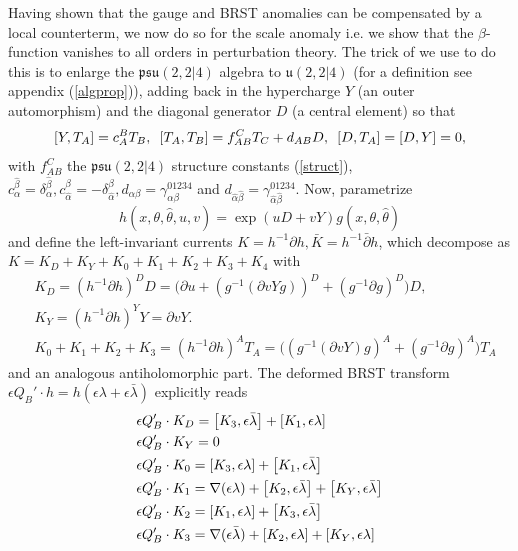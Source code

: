 \documentclass[12pt]{article}
\def\be{\begin{equation}}
\def\ee{\end{equation}}
\numberwithin{equation}{section}
\newcommand{\h}[1]{\hat{#1}}
\begin{document}
Having shown that the gauge and BRST anomalies can be compensated by a local counterterm, we now do so for the scale anomaly i.e. we show that the $\beta$-function vanishes to all orders in perturbation theory. The trick of \cite{Berkovits:1999im} we use to do this is to enlarge the $\mathfrak{psu}(2,2|4)$ algebra to $\mathfrak{u}(2,2|4)$ (for a definition see appendix (\ref{algprop})), adding back in the hypercharge $Y$ (an outer automorphism) and the diagonal generator $D$ (a central element) so that
\be
\comm{Y}{T_A} = c_A^B T_B, \,\,\, \comm{T_A}{T_B} = f_{AB}^C T_C + d_{AB} D, \,\,\, \comm{D}{T_A} = \comm{D}{Y} = 0,
\label{newStruct}
\ee
with $f_{AB}^C$ the $\mathfrak{psu}(2,2|4)$ structure constants (\ref{struct}), $c_\alpha^{\h{\beta}} = \delta_\alpha^{\h{\beta}}, c_{\h{\alpha}}^\beta = -\delta_{\h{\alpha}}^\beta, d_{\alpha \beta} = \gamma_{\alpha \beta}^{01234}$ and $d_{\h{\alpha}\h{\beta}} = \gamma_{\h{\alpha}\h{\beta}}^{01234}$. Now, parametrize
\be
h(x,\theta,\h{\theta},u,v) = \exp(u D + v Y) g(x,\theta, \h{\theta})
\ee
and define the left-invariant currents $K = h^{-1} \partial h, \bar{K} = h^{-1} \bar{\partial} h$, which decompose as $K = K_D + K_Y + K_0 + K_1 + K_2 + K_3 + K_4$ with
\be
\begin{aligned}
	&K_D = (h^{-1} \partial h)^D D = \big(\partial u + (g^{-1} (\partial v Y g))^D + (g^{-1} \partial g)^D\big)D, \\
	&K_Y = (h^{-1} \partial h)^Y Y = \partial v Y. \\
	&K_0 + K_1 + K_2 + K_3 = (h^{-1}\partial h)^A T_A = \big((g^{-1}(\partial v Y)g)^A + (g^{-1}\partial g)^A \big)T_A
	\label{Kdecomp}
\end{aligned}
\ee
and an analogous antiholomorphic part.
The deformed BRST transform $\epsilon Q_B' \cdot h = h(\epsilon \lambda + \epsilon \bar{\lambda})$ explicitly reads
\begin{align}
&\epsilon Q_B' \cdot K_D = \comm{K_3}{\epsilon \bar{\lambda}} + \comm{K_1}{\epsilon \lambda} \\
&\epsilon Q_B' \cdot K_Y = 0 \\
& \epsilon Q_B' \cdot K_0 = \comm{K_3}{\epsilon \lambda} + \comm{K_1}{\epsilon \bar{\lambda}} \\
& \epsilon Q_B' \cdot K_1 = \nabla (\epsilon \lambda) +\comm{K_2}{\epsilon \bar{\lambda}} +  \comm{K_Y}{\epsilon \bar{\lambda}} \\
& \epsilon Q_B' \cdot K_2 = \comm{K_1}{\epsilon \lambda} + \comm{K_3}{\epsilon \bar{\lambda}} \\
& \epsilon Q_B' \cdot K_3 = \nabla (\epsilon \bar{\lambda}) + \comm{K_2}{\epsilon \lambda} + \comm{K_Y}{\epsilon \lambda}
\end{align}
\end{document}
